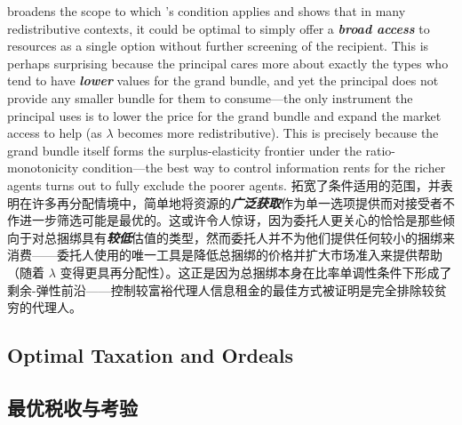 \documentclass[12pt,letterpaper]{article}
\newenvironment{original}{\color{black}\noindent}{}
\newenvironment{translation}{\color{blue}\noindent}{}
\theoremstyle{plain}
\theoremstyle{definition}
\theoremstyle{remark}
\renewcommand{\1}{\mathds{1}}
\theoremstyle{definition}
\begin{document}
\begin{original}
 broadens the scope to which \citet{haghpanah2021pure}'s condition applies and shows that in many redistributive contexts, it could be optimal to simply offer a \textit{\textbf{broad access}} to resources as a single option without further screening of the recipient. This is perhaps surprising because the principal cares more about exactly the types who tend to have \textit{\textbf{lower}} values for the grand bundle, and yet the principal does not provide any smaller bundle for them to consume---the only instrument the principal uses is to lower the price for the grand bundle and expand the market access to help (as $\lambda$ becomes more redistributive). This is precisely because the grand bundle itself forms the surplus-elasticity frontier under the ratio-monotonicity condition---the best way to control information rents for the richer agents turns out to fully exclude the poorer agents.
\end{original}
\begin{translation}
拓宽了\citet{haghpanah2021pure}条件适用的范围，并表明在许多再分配情境中，简单地将资源的\textit{\textbf{广泛获取}}作为单一选项提供而对接受者不作进一步筛选可能是最优的。这或许令人惊讶，因为委托人更关心的恰恰是那些倾向于对总捆绑具有\textit{\textbf{较低}}估值的类型，然而委托人并不为他们提供任何较小的捆绑来消费——委托人使用的唯一工具是降低总捆绑的价格并扩大市场准入来提供帮助（随着 $\lambda$ 变得更具再分配性）。这正是因为总捆绑本身在比率单调性条件下形成了剩余-弹性前沿——控制较富裕代理人信息租金的最佳方式被证明是完全排除较贫穷的代理人。
\end{translation}

\begin{original}
\subsection{Optimal Taxation and Ordeals}
\end{original}
\begin{translation}
\subsection{最优税收与考验}
\end{translation}
\end{document}
